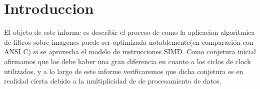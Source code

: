 \documentclass[a4paper,10pt]{article}
\title{}
\author{}
\date{}
\begin{document}
\maketitle
\section{Introduccion}
El objeto de este informe es describir el proceso de como la aplicacion algoritmica de filtros sobre imagenes
puede ser optimizada notablemente(en comparación con ANSI C) si se aprovecha el modelo de instrucciones
SIMD. Como conjetura inicial afirmamos que los debe haber una  gran diferencia en cuanto a los ciclos
de clock utilizados, y a lo largo de este informe verificaremos que dicha conjetura es en realidad cierta
debido a la multiplicidad de de procesamiento de datos.\\

 
\end{document}
